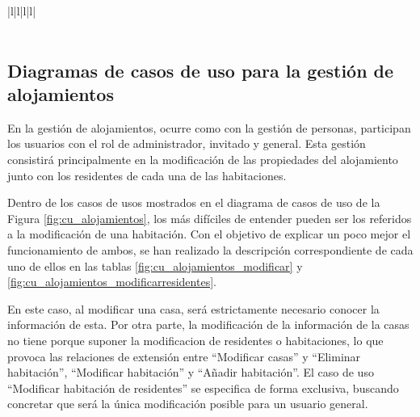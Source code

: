 \begin{table}[hp!]
{\begin{tabular}{|l|l|l|l|}
        \hline
                                                                                                                                                                                                                            \\ 
        \hline
            \\
        \hline
        \end{tabular}
    }
    \caption{Curso de eventos del caso de uso 3}
\end{table}

\newpage

\subsection{Diagramas de casos de uso para la gestión de alojamientos}

En la gestión de alojamientos, ocurre como con la gestión de personas, participan los usuarios con el rol de administrador, invitado y general. Esta gestión consistirá principalmente en la modificación de las propiedades del alojamiento junto con los residentes de cada una de las habitaciones. 

Dentro de los casos de usos mostrados en el diagrama de casos de uso de la Figura \ref{fig:cu_alojamientos}, los más difíciles de entender pueden ser los referidos a la modificación de una habitación. Con el objetivo de explicar un poco mejor el funcionamiento de ambos, se han realizado la descripción correspondiente de cada uno de ellos en las tablas \ref{fig:cu_alojamientos_modificar} y \ref{fig:cu_alojamientos_modificarresidentes}. 

En este caso, al modificar una casa, será estrictamente necesario conocer la información de esta. Por otra parte, la modificación de la información de la casas no tiene porque suponer la modificacion de residentes o habitaciones, lo que provoca las relaciones de extensión entre ``Modificar casas'' y ``Eliminar habitación'', ``Modificar habitación'' y ``Añadir habitación''. El caso de uso ``Modificar habitación de residentes'' se especifica de forma exclusiva, buscando concretar que será la única modificación posible para un usuario general.

